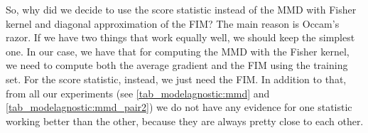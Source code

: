 {So, why did we decide to use the score statistic instead of the MMD with Fisher kernel and diagonal approximation of the FIM? The main reason is Occam's razor. If we have two things that work equally well, we should keep the simplest one. In our case, we have that for computing the MMD with the Fisher kernel, we need to compute both the average gradient and the FIM using the training set. For the score statistic, instead, we just need the FIM. In addition to that, from all our experiments (see \cref{tab_modelagnostic:mmd} and \cref{tab_modelagnostic:mmd_pair2}) we do not have any evidence for one statistic working better than the other, because they are always pretty close to each other.



}
